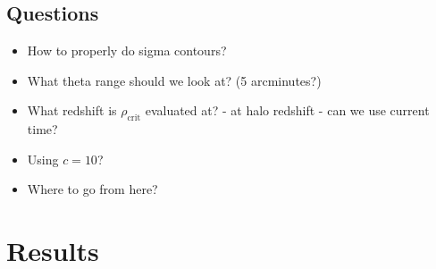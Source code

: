 \documentclass[10pt]{article}
\begin{document}
\subsection{Questions}
\begin{itemize}
    \item How to properly do sigma contours?
    \item What theta range should we look at? (5 arcminutes?)
    \item What redshift is $\rho_\mathrm{crit}$ evaluated at? - at halo redshift - can we use current time?
    \item Using $c = 10$?
    \item Where to go from here?
\end{itemize}


\section{Results}





\end{document}

